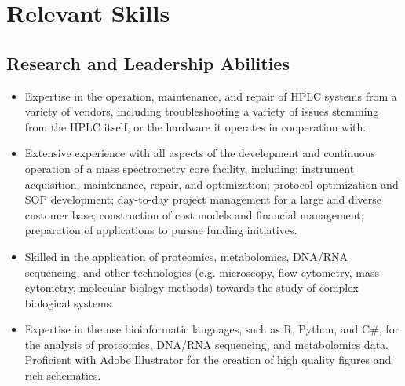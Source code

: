 \documentclass[11pt]{article}
\begin{document}
\section*{Relevant Skills}
\begin{addmargin}[3em]{2em}%
	\subsection*{Research and Leadership Abilities}
	\begin{itemize}
		\item Expertise in the operation, maintenance, and repair of HPLC systems from a variety of vendors, including troubleshooting a variety of issues stemming from the HPLC itself, or the hardware it operates in cooperation with.
        \item Extensive experience with all aspects of the development and continuous operation of a mass spectrometry core facility, including: instrument acquisition, maintenance, repair, and optimization; protocol optimization and SOP development; day-to-day project management for a large and diverse customer base; construction of cost models and financial management; preparation of applications to pursue funding initiatives. 
        \item Skilled in the application of proteomics, metabolomics, DNA/RNA sequencing, and other technologies (e.g. microscopy, flow cytometry, mass cytometry, molecular biology methods) towards the study of complex biological systems.
        \item Expertise in the use bioinformatic languages, such as R, Python, and C\#, for the analysis of proteomics, DNA/RNA sequencing, and metabolomics data. Proficient with Adobe Illustrator for the creation of high quality figures and rich schematics.
	\end{itemize}
\end{addmargin}
\end{document}
